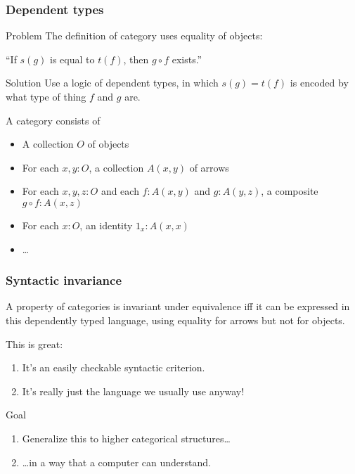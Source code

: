 \documentclass{beamer}
\begin{document}
\begin{frame}
  \frametitle{Dependent types}
  \begin{block}{Problem}
    The \alert<1>{definition} of category uses equality of objects:
    \begin{center}
      ``If $s(g)$ is \alert<1>{equal to} $t(f)$, then $g\circ f$ exists.''
    \end{center}
  \end{block}
  \begin{block}{Solution}
    Use a logic of \alert<2>{dependent types}, in which $s(g)=t(f)$ is encoded by what \alert<2>{type of thing} $f$ and $g$ are.
  \end{block}
  A category consists of
  \begin{itemize}
  \item A collection $O$ of objects
  \item For each $x,y:O$, a collection $A(x,y)$ of arrows
  \item For each $x,y,z:O$ and each $f:A(x,y)$ and $g:A(y,z)$, a composite $g\circ f: A(x,z)$
  \item For each $x:O$, an identity $1_x:A(x,x)$
  \item \dots
  \end{itemize}
\end{frame}

\begin{frame}
  \frametitle{Syntactic invariance}
  \begin{theorem}
    A {property} of categories is invariant under equivalence iff it can be expressed in this dependently typed language, using equality for arrows but not for objects.
  \end{theorem}
  This is great:
  \begin{enumerate}
  \item It's an easily checkable syntactic criterion.
  \item It's really just the language we usually use anyway!
  \end{enumerate}
  \pause
  \begin{block}{Goal}
    \begin{enumerate}
    \item Generalize this to higher categorical structures\dots
    \item \dots in a way that a computer can understand.
    \end{enumerate}
  \end{block}
\end{frame}
\end{document}
